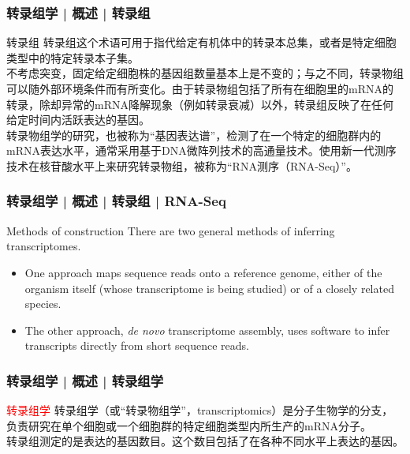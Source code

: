 \begin{frame}
  \frametitle{转录组学 | 概述 | 转录组}
  \begin{block}{转录组}
转录组这个术语可用于指代给定有机体中的转录本总集，或者是特定细胞类型中的特定转录本子集。\\
\vspace{0.5em}
不考虑突变，固定给定细胞株的基因组数量基本上是不变的；与之不同，转录物组可以随外部环境条件而有所变化。由于转录物组包括了所有在细胞里的mRNA的转录，除却异常的mRNA降解现象（例如转录衰减）以外，转录组反映了在任何给定时间内活跃表达的基因。\\
\vspace{0.5em}
转录物组学的研究，也被称为“基因表达谱”，检测了在一个特定的细胞群内的mRNA表达水平，通常采用基于DNA微阵列技术的高通量技术。使用新一代测序技术在核苷酸水平上来研究转录物组，被称为“RNA测序（RNA-Seq）”。
  \end{block}
\end{frame}

\begin{frame}
  \frametitle{转录组学 | 概述 | 转录组 | RNA-Seq}
  \begin{block}{Methods of construction}
    There are two general methods of inferring transcriptomes.
    \begin{itemize}
      \item One approach maps sequence reads onto a reference genome, either of the organism itself (whose transcriptome is being studied) or of a closely related species.
      \item The other approach, \textit{de novo} transcriptome assembly, uses software to infer transcripts directly from short sequence reads.
    \end{itemize}
  \end{block}
\end{frame}

\begin{frame}
  \frametitle{转录组学 | 概述 | 转录组学}
  \begin{block}{\textcolor{red}{转录组学}}
转录组学（或“转录物组学”，transcriptomics）是分子生物学的分支，负责研究在单个细胞或一个细胞群的特定细胞类型内所生产的mRNA分子。\\
    \vspace{0.5em}
转录组测定的是表达的基因数目。这个数目包括了在各种不同水平上表达的基因。\\
\end{block}
\end{frame}

